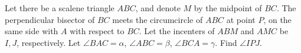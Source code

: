 Let there be a scalene triangle $ABC$, and denote $M$ by the midpoint of $BC$. The perpendicular bisector of $BC$ meets the circumcircle of $ABC$ at point $P$, on the same side with $A$ with respect to $BC$. Let the incenters of $ABM$ and $AMC$ be $I,J$, respectively. Let $\angle BAC=\alpha$, $\angle ABC=\beta$, $\angle BCA=\gamma$. Find $\angle IPJ$.
